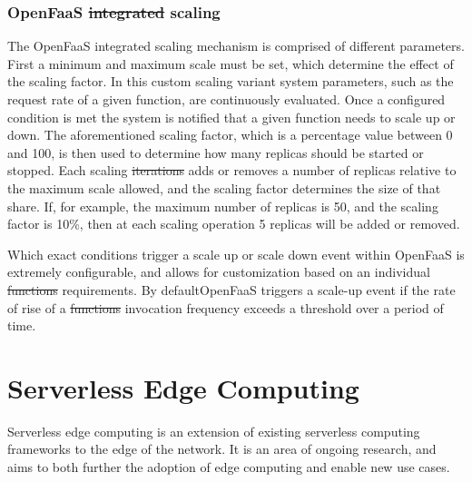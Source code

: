 \documentclass[draft,final]{vutinfth} %
\providecommand{\DIFaddtex}[1]{{\protect\color{blue}\uwave{#1}}} %
\providecommand{\DIFdeltex}[1]{{\protect\color{red}\sout{#1}}}                      %
\providecommand{\DIFaddbegin}{} %
\providecommand{\DIFaddend}{} %
\providecommand{\DIFdelbegin}{} %
\providecommand{\DIFdelend}{} %
\providecommand{\DIFadd}[1]{\texorpdfstring{\DIFaddtex{#1}}{#1}} %
\providecommand{\DIFdel}[1]{\texorpdfstring{\DIFdeltex{#1}}{}} %
\begin{document}
\subsubsection{OpenFaaS \DIFdelbegin \DIFdel{integrated }\DIFdelend scaling}
The OpenFaaS integrated scaling mechanism is comprised of different parameters.
First a minimum and maximum scale must be set, which determine the effect of the scaling factor.
In this custom scaling variant system parameters, such as the request rate of a given function, are continuously evaluated.
Once a configured condition is met the system is notified that a given function needs to scale up or down.
The aforementioned scaling factor, which is a percentage value between 0 and 100, is then used to determine how many replicas should be started or stopped\cite{openfaas-autoscaling}.
Each scaling \DIFdelbegin \DIFdel{iterations }\DIFdelend \DIFaddbegin \DIFadd{iteration }\DIFaddend adds or removes a number of replicas relative to the maximum scale allowed, and the scaling factor determines the size of that share.
If, for example, the maximum number of replicas is 50, and the scaling factor is 10\%, then at each scaling operation 5 replicas will be added or removed.

Which exact conditions trigger a scale up or scale down event within OpenFaaS is extremely configurable, and allows for customization based on an individual \DIFdelbegin \DIFdel{functions }\DIFdelend \DIFaddbegin \DIFadd{function's }\DIFaddend requirements.
By default\DIFaddbegin \DIFadd{, }\DIFaddend OpenFaaS triggers a scale-up event if the rate of rise of a \DIFdelbegin \DIFdel{functions }\DIFdelend \DIFaddbegin \DIFadd{function's }\DIFaddend invocation frequency exceeds a threshold over a period of time.




\section{Serverless Edge Computing}

Serverless edge computing is an extension of existing serverless computing frameworks to the edge of the network.
It is an area of ongoing research, and aims to both further the adoption of edge computing and enable new use cases\cite{nasticServerlessRealTimeData2017}.
\end{document}

